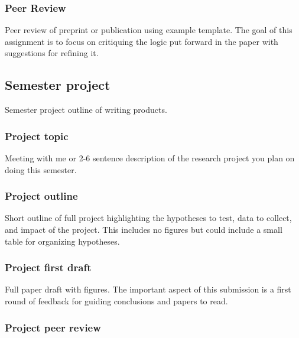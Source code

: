 \documentclass[11pt,]{article}
\begin{document}
\hypertarget{peer-review}{%
\subsubsection{Peer Review}\label{peer-review}}

Peer review of preprint or publication using example template. The goal
of this assignment is to focus on critiquing the logic put forward in
the paper with suggestions for refining it.

\hypertarget{semester-project}{%
\subsection{Semester project}\label{semester-project}}

Semester project outline of writing products.

\hypertarget{project-topic}{%
\subsubsection{Project topic}\label{project-topic}}

Meeting with me or 2-6 sentence description of the research project you
plan on doing this semester.

\hypertarget{project-outline}{%
\subsubsection{Project outline}\label{project-outline}}

Short outline of full project highlighting the hypotheses to test, data
to collect, and impact of the project. This includes no figures but
could include a small table for organizing hypotheses.

\hypertarget{project-first-draft}{%
\subsubsection{Project first draft}\label{project-first-draft}}

Full paper draft with figures. The important aspect of this submission
is a first round of feedback for guiding conclusions and papers to read.

\hypertarget{project-peer-review}{%
\subsubsection{Project peer review}\label{project-peer-review}}
\end{document}
